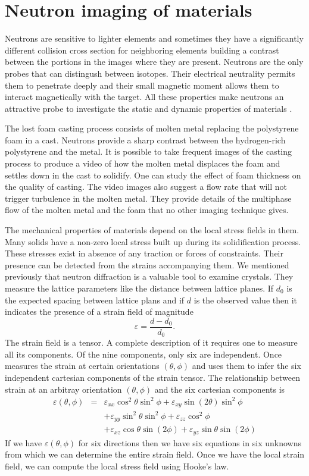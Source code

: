 \documentclass{article}
\numberwithin{equation}{section}
\begin{document}
\section{Neutron imaging of materials}\label{s13}
Neutrons are sensitive to lighter elements and sometimes they have a 
significantly different collision cross section for neighboring elements 
building a contrast between the portions in the images where they are present.
Neutrons are the only probes that can distingush between isotopes. Their
electrical neutrality permits them to penetrate deeply and their small magnetic
moment allows them to interact magnetically with the target. All these
properties make neutrons an attractive probe to investigate the static and
dynamic properties of materials \cite{anderson2008neutron}.

The lost foam casting process consists of molten metal replacing the polystyrene
foam in a cast. Neutrons provide a sharp contrast between the hydrogen-rich
polystyrene and the metal. It is possible to take frequent images of the 
casting process to produce a video of how the molten metal displaces the foam
and settles down in the cast to solidify. One can study the effect of foam
thickness on the quality of casting. The video images also suggest a flow
rate that will not trigger turbulence in the molten metal. They provide 
details of the multiphase flow of the molten metal and the foam that no other
imaging technique gives.

The mechanical properties of materials depend on the local stress fields in
them. Many solids have a non-zero local stress built up during its 
solidification process. These stresses exist in absence of any traction or
forces of constraints. Their presence can be detected from the strains 
accompanying them. We mentioned previously that neutron diffraction is a 
valuable tool to examine crystals. They measure the lattice parameters like
the distance between lattice planes. If $d_0$ is the expected spacing between
lattice plans and if $d$ is the observed value then it indicates the presence
of a strain field of magnitude
\[
\varepsilon = \frac{d - d_0}{d_0}.
\]
The strain field is a tensor. A complete description of it requires one to
measure all its components. Of the nine components, only six are independent.
Once measures the strain at certain orientations $(\theta, \phi)$ and uses
them to infer the six independent cartesian components of the strain tensor.
The relationship between strain at an arbitray orientation $(\theta, \phi)$
and the six cartesian components is
\begin{eqnarray}
\varepsilon(\theta, \phi) &=& \varepsilon_{xx}\cos^2\theta\sin^2\phi +
\varepsilon_{xy}\sin(2\theta)\sin^2\phi \nonumber \\
 & & + \varepsilon_{yy}\sin^2\theta\sin^2\phi+\varepsilon_{zz}\cos^2\phi 
\nonumber \\
 & & + \varepsilon_{xz}\cos\theta\sin(2\phi)+
\varepsilon_{yz}\sin\theta\sin(2\phi) \label{s13e1}
\end{eqnarray}
If we have $\varepsilon(\theta,\phi)$ for six directions then we have six
equations in six unknowns from which we can determine the entire strain field.
Once we have the local strain field, we can compute the local stress field 
using Hooke's law.
\end{document}
